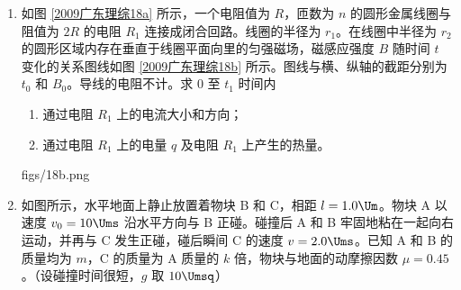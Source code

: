 \documentclass[\gkver]{gaokaozhenti}
\begin{document}
\begin{enumerate}
{
}

\item
如图 \ref{2009广东理综18a} 所示，一个电阻值为 $R$，匝数为 $n$ 的圆形金属线圈与阻值为 $2R$ 的电阻 $R_1$ 连接成闭合回路。线圈的半径为 $r_1$。在线圈中半径为 $r_2$ 的圆形区域内存在垂直于线圈平面向里的匀强磁场，磁感应强度 $B$ 随时间 $t$ 变化的关系图线如图 \ref{2009广东理综18b} 所示。图线与横、纵轴的截距分别为 $t_0$ 和 $B_0$。导线的电阻不计。求 $0$ 至 $t_1$ 时间内

\begin{enumerate}
	\item
	通过电阻 $R_1$ 上的电流大小和方向；
	\item
	通过电阻 $R_1$ 上的电量 $q$ 及电阻 $R_1$ 上产生的热量。
\end{enumerate}
{figs/18b.png}



\item
如图所示，水平地面上静止放置着物块 B 和 C，相距 $l=1.0\Um$。物块 A 以速度 $v_0=10\Ums$ 沿水平方向与 B 正碰。碰撞后 A 和 B 牢固地粘在一起向右运动，并再与 C 发生正碰，碰后瞬间 C 的速度 $v=2.0\Ums$。已知 A 和 B 的质量均为 $m$，C 的质量为 A 质量的 $k$ 倍，物块与地面的动摩擦因数 $\mu=0.45$。（设碰撞时间很短，$g$ 取 $10\Umsq$）


\end{enumerate}
\end{document}
